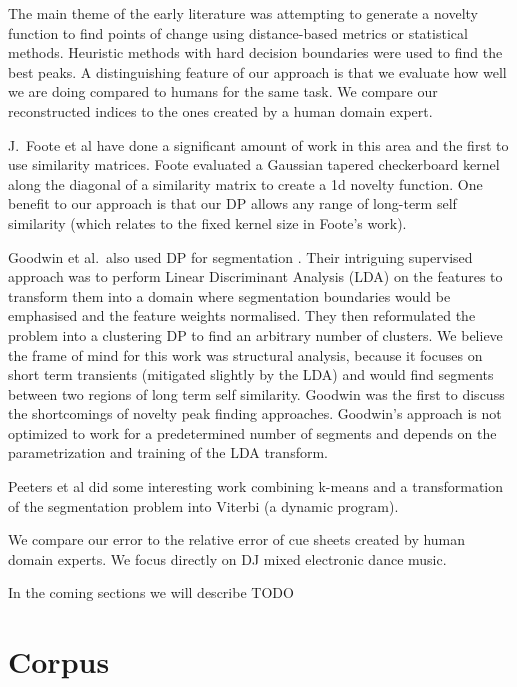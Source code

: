 \documentclass[twocolumn]{article}
\begin{document}
The main theme of the early literature was attempting to generate a novelty function to find points of change using distance-based metrics or statistical methods. Heuristic methods with hard decision boundaries were used to find the best peaks. A distinguishing feature of our approach is that we evaluate how well we are doing compared to humans for the same task. We compare our reconstructed indices to the ones created by a human domain expert. 

J.\ Foote et al \citep{foote1999visualizing,foote1997similarity,foote2000automatic,foote2003media,foote2001visualizing} have done a significant amount of work in this area and the first to use similarity matrices. Foote evaluated a Gaussian tapered checkerboard kernel along the diagonal of a similarity matrix to create a 1d novelty function. One benefit to our approach is that our DP allows any range of long-term self similarity (which relates to the fixed kernel size in Foote's work).

Goodwin et al.\ also used DP for segmentation \citep{goodwin2003audio,goodwin2004dynamic}. Their intriguing supervised approach was to perform Linear Discriminant Analysis (LDA) on the features to transform them into a domain where segmentation boundaries would be emphasised and the feature weights normalised. They then reformulated the problem into a clustering DP to find an arbitrary number of clusters. We believe the frame of mind for this work was structural analysis, because it focuses on short term transients (mitigated slightly by the LDA) and would find segments between two regions of long term self similarity. Goodwin was the first to discuss the shortcomings of novelty peak finding approaches. Goodwin's approach is not optimized to work for a predetermined number of segments and depends on the parametrization and training of the LDA transform. 

Peeters et al \citep{peeters2002toward,peeters2004deriving} did some interesting work combining k-means and a transformation of the segmentation problem into Viterbi (a dynamic program).

We compare our error to the relative error of cue sheets created by human domain experts. We focus directly on DJ mixed electronic dance music.

In the coming sections we will describe TODO

\section{Corpus}\label{dataset}
\end{document}
